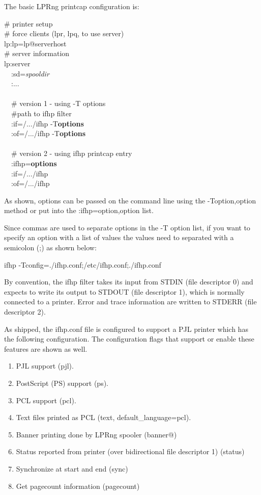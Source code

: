 \documentclass[a4paper]{article}
\begin{document}
The basic LPRng printcap configuration is:
\begin{tscreen}
\# printer setup  \\ 
\#  force clients (lpr, lpq, to use server)  \\ 
lp:lp=lp@serverhost  \\ 
\# server information  \\ 
lp:server  \\ 
~~:sd={\itshape spooldir\/}  \\ 
~~:...  \\ 
~~\\ 
~~\# version 1 - using -T options  \\ 
~~\#path to ifhp filter  \\ 
~~:if=/.../ifhp -T{\bfseries options}  \\ 
~~:of=/.../ifhp -T{\bfseries options}  \\ 
~~\\ 
~~\# version 2 - using ifhp printcap entry  \\ 
~~:ifhp={\bfseries options}  \\ 
~~:if=/.../ifhp  \\ 
~~:of=/.../ifhp  
\end{tscreen}


As shown,
options can be passed on the command line using the
{\ttfamily -Toption,option}
method or put into the
{\ttfamily :ifhp=option,option}
list.

Since commas are used to separate options in the
{\ttfamily -T}
option list,
if you want to specify an option with a list of values
the values need to separated with a semicolon
({\ttfamily ;})
as shown below:
\begin{tscreen}
ifhp -Tconfig=./ifhp.conf;/etc/ifhp.conf;./ifhp.conf
\end{tscreen}


By convention,
the
{\ttfamily ifhp}
filter takes its input from STDIN (file descriptor 0)
and expects to write its output to STDOUT (file descriptor 1),
which is normally connected to a printer.
Error and trace information are written to STDERR (file descriptor 2).

As shipped,
the
{\ttfamily ifhp.conf}
file is configured to support a PJL printer which has
the following configuration.
The configuration flags that support or enable these
features are shown as well.
\begin{enumerate}
\item  PJL support ({\ttfamily pjl}).
\item  PostScript (PS) support ({\ttfamily ps}).
\item  PCL support ({\ttfamily pcl}).
\item  Text files printed as PCL ({\ttfamily text}, {\ttfamily default\_language=pcl}).
\item  Banner printing done by LPRng spooler ({\ttfamily banner@})
\item  Status reported from printer (over bidirectional file descriptor 1)  ({\ttfamily status})
\item  Synchronize at start and end ({\ttfamily sync})
\item  Get pagecount information ({\ttfamily pagecount})
\end{enumerate}
\end{document}
